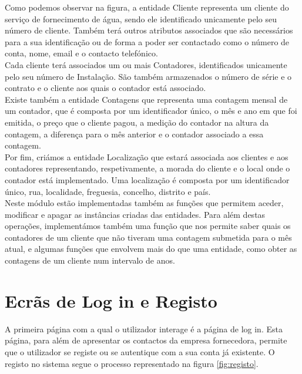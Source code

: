Como podemos observar na figura, a entidade Cliente representa um cliente do serviço de fornecimento de água, sendo ele identificado unicamente pelo seu número de cliente. Também terá outros atributos associados que são necessários para a sua identificação ou de forma a poder ser contactado como o número de conta, nome, email e o contacto telefónico.\\ 
Cada cliente terá associados um ou mais Contadores, identificados unicamente pelo seu número de Instalação. São também armazenados o número de série e o contrato e o cliente aos quais o contador está associado.\\
Existe também a entidade Contagens que representa uma contagem mensal de um contador, que é composta por um identificador único, o mês e ano em que foi emitida, o preço que o cliente pagou, a medição do contador na altura da contagem, a diferença para o mês anterior e o contador associado a essa contagem.\\
Por fim, criámos a entidade Localização que estará associada aos clientes e aos contadores representando, respetivamente, a morada do cliente e o local onde o contador está implementado. Uma localização é composta por um identificador único, rua, localidade, freguesia, concelho, distrito e país.\\ 
Neste módulo estão implementadas também as funções que permitem aceder, modificar e apagar as instâncias criadas das entidades. Para além destas operações, implementámos também uma função que nos permite saber quais os contadores de um cliente que não tiveram uma contagem submetida para o mês atual, e algumas funções que envolvem mais do que uma entidade, como obter as contagens de um cliente num intervalo de anos.


\section{Ecrãs de Log in e Registo} \label{ecra:login} %
A primeira página com a qual o utilizador interage é a página de log in. Esta página, para além de apresentar os contactos da empresa fornecedora, permite que o utilizador se registe ou se autentique com a sua conta já existente.
O registo no sistema segue o processo representado na figura \ref{fig:registo}.

